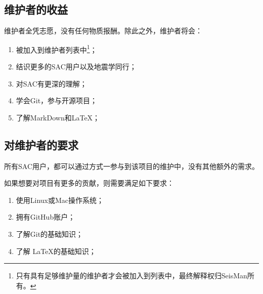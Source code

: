 \subsection{维护者的收益}
维护者全凭志愿，没有任何物质报酬。除此之外，维护者将会：
\begin{enumerate}
\item 被加入到维护者列表中\footnote{只有具有足够维护量的维护者才会被加入到列表中，最终解释权归SeisMan所有。}；
\item 结识更多的SAC用户以及地震学同行；
\item 对SAC有更深的理解；
\item 学会Git，参与开源项目；
\item 了解MarkDown和\LaTeX ；
\end{enumerate}

\subsection{对维护者的要求}
所有SAC用户，都可以通过方式一参与到该项目的维护中，没有其他额外的需求。

如果想要对项目有更多的贡献，则需要满足如下要求：
\begin{enumerate}
\item 使用Linux或Mac操作系统；
\item 拥有GitHub账户；
\item 了解Git的基础知识；
\item 了解 \LaTeX 的基础知识；
\end{enumerate}
